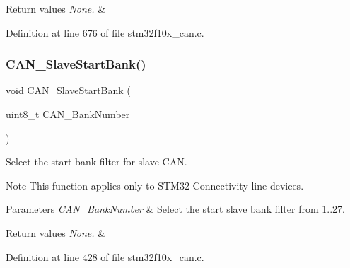 \begin{DoxyRetVals}{Return values}
{\em None.} & \\
\hline
\end{DoxyRetVals}


Definition at line 676 of file stm32f10x\+\_\+can.\+c.

\mbox{\label{group___c_a_n___exported___functions_ga109ff8960bc59f44b984c9646f17b3c0}} 
\subsubsection{\texorpdfstring{C\+A\+N\+\_\+\+Slave\+Start\+Bank()}{CAN\_SlaveStartBank()}}
{\footnotesize\ttfamily void C\+A\+N\+\_\+\+Slave\+Start\+Bank (\begin{DoxyParamCaption}\item[{uint8\+\_\+t}]{C\+A\+N\+\_\+\+Bank\+Number }\end{DoxyParamCaption})}



Select the start bank filter for slave C\+AN. 

\begin{DoxyNote}{Note}
This function applies only to S\+T\+M32 Connectivity line devices. 
\end{DoxyNote}

\begin{DoxyParams}{Parameters}
{\em C\+A\+N\+\_\+\+Bank\+Number} & Select the start slave bank filter from 1..27. \\
\hline
\end{DoxyParams}

\begin{DoxyRetVals}{Return values}
{\em None.} & \\
\hline
\end{DoxyRetVals}


Definition at line 428 of file stm32f10x\+\_\+can.\+c.

\mbox{\label{group___c_a_n___exported___functions_ga640215e38765759d7eceb8a039046667}} 
